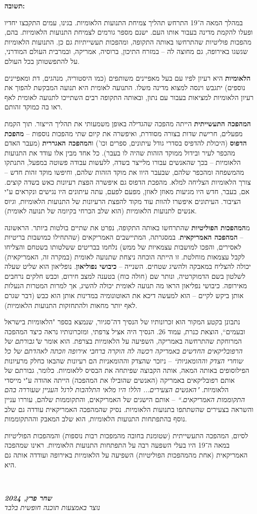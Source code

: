 \documentclass[]{article}
\newcommand\ndoc  {\dotfill \\ \vfil {\begin{center} {\textbf{\textit{שחר פרץ, 2024}} \\ \scriptsize \textit{נוצר באמצעות תוכנה חופשית בלבד}} \end{center}} \vfil	}
\newcommand\bs    {\blacksquare}
\begin{document}
		\textbf{תשובה: }
		
		במהלך המאה ה־19 התרחש תהליך צמיחת התנועות הלאומיות. בגינו, עמים התקבצו יחדיו ופעלו להקמת מדינה בעבור אותו העם. ישנם מספר גורמים לצמיחת התנועות הלאומיות. בהם, מהפכות פוליטיות שהתרחשו באותה התקופה, ומהפכות תעשייתיות גם כן. התנועות הלאומיות שגשגו באירופה, גם מחוצה לה – במזרח התיכון, ברוסיה, אמריקה, ובמרבית העולם המודרני, על להתפשטותן בכל העולם. 
		
		\textbf{הלאומיות} היא רעיון לפיו עם בעל מאפיינים משותפים (כמו היסטוריה, מנהגים, דת ומאפיינים נוספים) יתגבש וינסה למצוא מדינה משלו. התנועה לאומית היא תנועה המבקשת להפוך את רעיון הלאומיות למציאות בעבור עם נתון, ובאותה התקופה רבים השתייכו לתנועה לאומית לאף ראו בה כמוקד זהותם. 
		
		\textbf{המהפכה התעשייתית} הייתה מהפכה שהגדילה באופן משמעותי את תהליך הייצור. תוך הקמת מפעלים, חרישת שדות בצורה מסודרת, ואיפשרה את קיום שתי מהפכות נוספות – \textbf{מהפכת הדפוס} (היכולת להדפיס בסדרי גודל עיתונים, ספרים וכו') ו\textbf{המהפכה האגררית} (מעבר האדם מהכפר לעיר ובידול ממוקד הזהות שהיה לו בעבר). כל אחד מבין אלו עודד את התנועות הלאומיות – בכך שהאנשים עבורו מלייצר בשדה, ללעשות עבודה פשוטה במפעל, התנתקו מהמשפחה ומהכפר שלהם, שבעבר היוו את מוקד הזהות שלהם, וחיפשו מוקד זהות חדש – צורך הלאומיות הצליחה למלא. מהפכת הדפוס גם איפשרה הפצת רעיונות כאש בשדה קוצים. אם, בעבר, חדש היו מגיעות מאוזן לאוזן, מפעם לפעם, עתה עיתונים היו נגישים ונקראים ע"י הציבור. העיתונים איפשרו להוות עוד מקוד להפצת הרעיונות של התנועות הלאומיות, וגיוס אנשים לתנועות הלאומיות (הוא שלב הכרחי בקיומה של תנועה לאומית). 
		
		מ\textbf{המהפכות הפוליטיות} שהתרחשו באותה התקופה, נפרט את שתיים בולטות ביותר. הראשונה – \textbf{המהפכה האמריקאית}. במסגרתה, המתיישבים האמריקאים (שהתחילו כמושבות בריטיות לאסירים, והפכו למושבות עצמאיות של ממש) נלחמו בבריטים ששלטותו בשטחם והצליחו לקבל עצמאות מוחלטת. זו הייתה הוכחה ניצחת שתנועה לאומית (במקרה זה, האמריקאית) יכולה להצליח במאבקה ולהשיג שטחים. השנייה – \textbf{כיבושי נפוליאון}. נופליאון הוא שליט שעלה לשלטון בשם הדמוקרטיה, ונותר שם (חולה כוח) בטענה למצב חירום, וכבש חלקים נרחבים מאירופה. כיבושי נפליאון הראו מה תנועה לאומית יכולה להשיג, אך למרות המטרות הנעלות אותן ביקש לקיים – הוא למעשה דיכא את האוטונומיה במדינות אותן הוא כבש (דבר שגרם לאף יותר מחאות ולהתחזקות התנועות הלאומיות). 
		
		נתבונן בקטע המקור הוא זכרונותיו של הנסיך דה־סגיור, שנמצא בספר "הלאומיות בישראל ובעמים``, הוצאת כנרת, עמוד 26. הנסיך היה אציל צרפתי, ומזכרונותיו נראה כיצד המהפכה המרוחקת שהתרחשה באמריקה, השפיעה על הלאומיות בצרפת. הוא אומר ש\textit{"גבורתם של הרפובליקאים החדשים באמריקה רכשה לה הוקרה ברחבי אירופה וזכתה לאהדתם של כל שוחרי הצדק וההומאניות``} – ניזכר שהצדק וההומאניות הם רעיונות שהבאו כחלק מרעיונות הפילוסופים באותה המאה, אותה הקבוצה שפיתחה את הבסיס ללאומיות. כלומר, גבורתם של אותם רפובליקאים באמריקה (האנשים שהובילו את המהפכה) הייתה אהודה ע"י מייסדי הלאומיות. \textit{"האנשים הצעירים... הללו היו מלאי התלהבות לרגל העניין שעוררה בהם התקוממות האמריקאים.``} – אותם הישגים של האמריקאים, והתקוממות שלהם, עוררו עניין והשראה בצעירים שהשתתפו בתנועות הלאומיות. נסיק שהמהפכה האמריקאית עודדה גם שלב נוסף בהתפתחות התנועות הלאומיות, הוא שלב המאבק וההתקוממות. 
		
		לסיום, המהפכה התעשייתית (שטומנת בחובה מהמפכות רבות נוספות) והמהפכות הפוליטיות במאה ה־19 היו בעלי השפעה רבה על התפתחות התנועות הלאומיות. ראינו שמהפכה האמריקאית (אחת מהמהפכות הפוליטיות) השפיעה על הלאומיות באירופה ועודדה אותה גם היא. \hfill \bs 
		
		\ndoc
		
		
		
		
\end{document}
